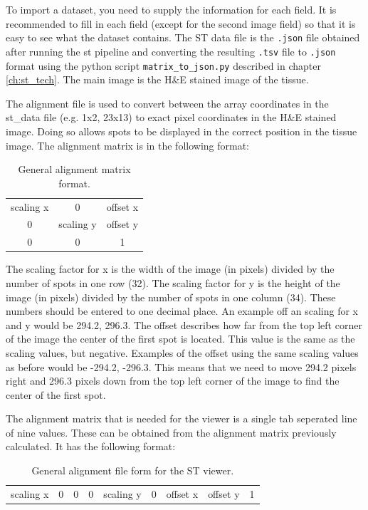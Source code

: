 \documentclass[10pt,a4paper,titlepage]{book}
\begin{document}
To import a dataset, you need to supply the information for each field. It is recommended to fill in each field (except for the second image field) so that it is easy to see what the dataset contains. The ST data file is the \texttt{.json} file obtained after running the st pipeline and converting the resulting \texttt{.tsv} file to \texttt{.json} format using the python script \texttt{matrix\_to\_json.py} described in chapter \ref{ch:st_tech}. The main image is the H\&E stained image of the tissue. 

The alignment file is used to convert between the array coordinates in the st\_data file (e.g. 1x2, 23x13) to exact pixel coordinates in the H\&E stained image. Doing so allows spots to be displayed in the correct position in the tissue image. The alignment matrix is in the following format:

\begin{table}[h]
\begin{center}
\caption{General alignment matrix format.}
\begin{tabular}{ccc}
scaling x & 0 & offset x \\
0 & scaling y & offset y \\
0 & 0 & 1 \\
\end{tabular}
\label{tab:align_matrix_format}
\end{center}
\end{table}

The scaling factor for x is the width of the image (in pixels) divided by the number of spots in one row (32). The scaling factor for y is the height of the image (in pixels) divided by the number of spots in one column (34). These numbers should be entered to one decimal place. An example off an scaling for x and y would be 294.2, 296.3. The offset describes how far from the top left corner of the image the center of the first spot is located. This value is the same as the scaling values, but negative. Examples of the offset using the same scaling values as before would be -294.2, -296.3. This means that we need to move 294.2 pixels right and 296.3 pixels down from the top left corner of the image to find the center of the first spot.

The alignment matrix that is needed for the viewer is a single tab seperated line of nine values. These can be obtained from the alignment matrix previously calculated. It has the following format:
\begin{table}[h]
\begin{center}
\caption{General alignment file form for the ST viewer.}
\begin{tabular}{*{9}{c}}
scaling x & 0 & 0 & 0 & scaling y & 0 & offset x & offset y & 1 \\
\end{tabular}
\label{tab:st_viewer_alignment}
\end{center}
\end{table}
\end{document}
